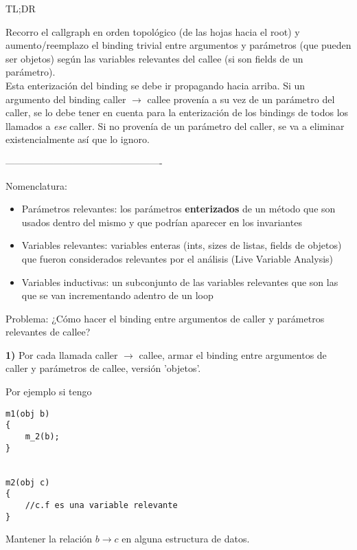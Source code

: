 \documentclass[10pt,a4paper,final]{report}
\begin{document}
TL;DR

Recorro el callgraph en orden topológico (de las hojas hacia el root) y aumento/reemplazo el binding trivial entre argumentos y parámetros (que pueden ser objetos) según las variables relevantes del callee (si son fields de un parámetro). \\

Esta enterización del binding se debe ir propagando hacia arriba. Si un argumento del binding caller $\rightarrow$ callee provenía a su vez de un parámetro del caller, se lo debe tener en cuenta para la enterización de los bindings de todos los llamados a \textit{ese} caller. Si no provenía de un parámetro del caller, se va a eliminar existencialmente así que lo ignoro.

\bigskip

-------------------------------------------------







Nomenclatura:

\begin{itemize}
	\item Parámetros relevantes: los parámetros \textbf{enterizados} de un método que son usados dentro del mismo y que podrían aparecer en los invariantes
	\item Variables relevantes: variables enteras (ints, sizes de listas, fields de objetos) que fueron considerados relevantes por el análisis (Live Variable Analysis)
	\item Variables inductivas: un subconjunto de las variables relevantes que son las que se van incrementando adentro de un loop
\end{itemize}


Problema: ¿Cómo hacer el binding entre argumentos de caller y parámetros relevantes de callee? \bigskip

\textbf{1)} Por cada llamada caller $\rightarrow$ callee, armar el binding entre argumentos de caller y parámetros de callee, versión 'objetos'.

Por ejemplo si tengo 
\begin{lstlisting}
m1(obj b)
{
	m_2(b);
}


m2(obj c)
{
	//c.f es una variable relevante
}

\end{lstlisting}

Mantener la relación $b\rightarrow c$ en alguna estructura de datos. \bigskip
\end{document}
